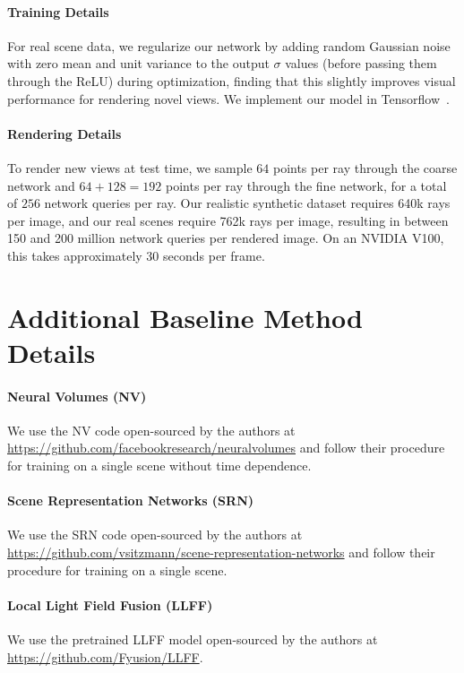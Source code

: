\documentclass[runningheads]{llncs}
\begin{document}
\paragraph{\textbf{Training Details}}
For real scene data, we regularize our network by adding random Gaussian noise with zero mean and unit variance to the output $\sigma$ values (before passing them through the ReLU) during optimization, finding that this slightly improves visual performance for rendering novel views. We implement our model in Tensorflow~\cite{tensorflow}.

\paragraph{\textbf{Rendering Details}}
To render new views at test time, we sample $64$ points per ray through the coarse network and $64+128=192$ points per ray through the fine network, for a total of $256$ network queries per ray. Our realistic synthetic dataset requires 640k rays per image, and our real scenes require 762k rays per image, resulting in between 150 and 200 million network queries per rendered image. On an NVIDIA V100, this takes approximately 30 seconds per frame.

\section{Additional Baseline Method Details}

\paragraph{\textbf{Neural Volumes (NV)}~\cite{neuralvolumes}}
We use the NV code open-sourced by the authors at \url{https://github.com/facebookresearch/neuralvolumes} and follow their procedure for training on a single scene without time dependence. 

\paragraph{\textbf{Scene Representation Networks (SRN)}~\cite{srn}}
We use the SRN code open-sourced by the authors at \url{https://github.com/vsitzmann/scene-representation-networks} and follow their procedure for training on a single scene.

\paragraph{\textbf{Local Light Field Fusion (LLFF)}~\cite{mildenhall19}}
We use the pretrained LLFF model open-sourced by the authors at \url{https://github.com/Fyusion/LLFF}.
\end{document}
